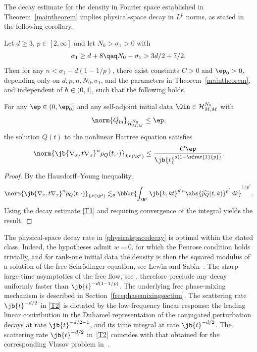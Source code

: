 The decay estimate for the density in Fourier space established in Theorem~\ref{maintheorem} implies physical-space decay in $L^p$ norms, as stated in the following corollary.
\begin{corollary}
Let $d\geq 3$, $p\in[2,\infty]$ and let $N_0>\sigma_1>0$ with
\begin{align*}
\sigma_1\geq d+8\qaq N_0-\sigma_1>3d/2+7/2.
\end{align*}
Then for any $n<\sigma_1-d(1-1/p)$, there exist constants $C>0$ and $\ep_0>0$, depending only on $d,p,n,N_0,\sigma_1$, and the parameters in Theorem~\ref{maintheorem}, and independent of $\hbar\in(0,1]$, such that the following holds.

For any $\ep\in(0,\ep_0]$ and any self-adjoint initial data $\Qin\in\mathcal{H}^{N_0}_{M,M}$ with
\begin{align*}
\norm{Q_{\mathrm{in}}}_{\mathcal H^{N_0}_{M,M}}\leq\ep,
\end{align*}
the solution $Q(t)$ to the nonlinear Hartree equation satisfies
\begin{align}\label{physicalspacedecay}
\norm{\jb{\nabla_x,t\nabla_x}^n\rho_Q(t,\cdot)}_{L^p(\R^d)}\leq \frac{C\ep}{\jb{ t}^{d(1-\sfrac{1}{p})}}.
\end{align}
\end{corollary}
\begin{proof}
By the Hausdorff--Young inequality,
\begin{align*}
\norm{\jb{\nabla_x,t\nabla_x}^n\rho_Q(t,\cdot)}_{L^p(\R^d)}
\lesssim_p \bbbr{\int_{\R^d} \jb{k,kt}^{p'n} \abs{\widehat{\rho_Q}(t,k)}^{p'} \,dk}^{1/p'}.
\end{align*}
Using the decay estimate \eqref{T1} and requiring convergence of the integral yields the result.
\end{proof}

\begin{remark}\label{optimalityremark}
The physical-space decay rate in \eqref{physicalspacedecay} is optimal within the stated class. Indeed, the hypotheses admit $w=0$, for which the Penrose condition holds trivially, and for rank-one initial data the density is then the squared modulus of a solution of the free Schrödinger equation, see Lewin and Sabin~\cite{LewinSabinI2015}. The sharp large-time asymptotics of the free flow, see \eg \cite[Ch.\,2]{Cazenave2003}, therefore preclude any decay uniformly faster than $\jb{t}^{-d(1-1/p)}$. The underlying free phase-mixing mechanism is described in Section~\ref{freephasemixingsection}. The scattering rate $\jb{t}^{-d/2}$ in \eqref{T2} is dictated by the low-frequency linear response: the leading linear contribution in the Duhamel representation of the conjugated perturbation decays at rate $\jb{t}^{-d/2-1}$, and its time integral at rate $\jb{t}^{-d/2}$. The scattering rate $\jb{t}^{-d/2}$ in~\eqref{T2} coincides with that obtained for the corresponding Vlasov problem in~\cite{BedrossianMasmoudiMouhot2018}.
\end{remark}

